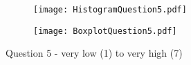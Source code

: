 \begin{figure}[htbp] %
\begin{center} 
\begin{subfigure} 
\centering
\texttt{[image: HistogramQuestion5.pdf]}
\end{subfigure} 
\begin{subfigure} 
\centering
\texttt{[image: BoxplotQuestion5.pdf]}
\end{subfigure}
  \caption[Question 5 - Histogram and Box plot]{Question 5 - very low (1) to very high (7)}
    \label{Question5} 
\end{center}
\end{figure}
